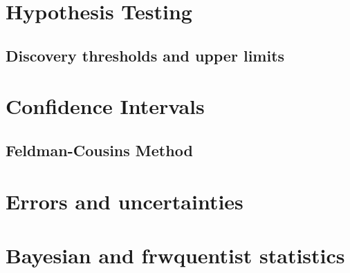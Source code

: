 \section{Hypothesis Testing}
\subsection{Discovery thresholds and upper limits}
\section{Confidence Intervals}
\subsection{Feldman-Cousins Method}
\section{Errors and uncertainties}
\section{Bayesian and frwquentist statistics}


